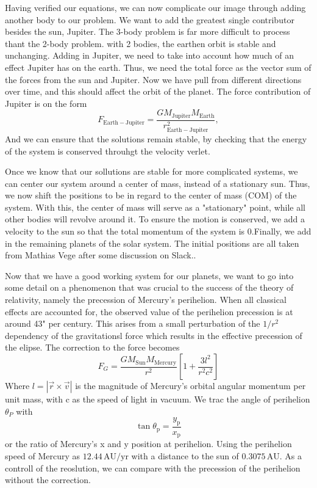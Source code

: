 \documentclass[10pt, twocolumn]{revtex4-1}
\begin{document}
Having verified our equations, we can now complicate our image through adding another body to our problem. We want to add the greatest single contributor
besides the sun, Jupiter. The 3-body problem is far more difficult to process thant the 2-body problem. with 2 bodies, the earthen orbit is stable and
unchanging. Adding in Jupiter, we need to take into account how much of an effect Jupiter has on the earth. Thus, we need the total force as the 
vector sum of the forces from the sun and Jupiter. Now we have pull from different directions over time, and this should affect the orbit of the planet.
The force contribution of Jupiter is on the form
\[
F_{\mathrm{Earth-Jupiter}}=\frac{GM_{\mathrm{Jupiter}}M_{\mathrm{Earth}}}{r_{\mathrm{Earth-Jupiter}}^2},
\]
And we can ensure that the solutions remain stable, by checking that the energy of the system is conserved throuhgt the velocity verlet. 

Once we know that our sollutions are stable for more complicated systems, we can center our system around a center of mass, instead of a stationary sun.
Thus, we now shift the positions to be in regard to the center of mass (COM) of the system. With this, the center of mass will serve as a "stationary" 
point, while all other bodies will revolve around it. To ensure the motion is conserved, we add a velocity to the sun so that the total momentum of the 
system is 0.Finally, we add in the remaining planets of the solar system. The initial positions are all taken from Mathias Vege after some discussion on
Slack.\cite{MathiasPlanetvalues}. 


Now that we have a good working system for our planets, we want to go into some detail on a phenomenon that was crucial to the success of the theory of
relativity, namely the precession of Mercury's perihelion. When all classical effects are accounted for, the observed value of the perihelion precession
is at around 43" per century. This arises from a small perturbation of the $1/r^2$ dependency of the gravitationsl force which results in the effective 
precession of the elipse. The correction to the force becomes 
\[
F_G = \frac{GM_\mathrm{Sun}M_\mathrm{Mercury}}{r^2}\left[1 + \frac{3l^2}{r^2c^2}\right]
\]
Where $l=|\vec{r}\times\vec{v}|$ is the magnitude of Mercury's orbital angular momentum per unit mass, with c as the speed of light in vacuum. We trac the
angle of perihelion $\theta_P$ with 
\[
\tan \theta_\mathrm{p} = \frac{y_\mathrm{p}}{x_\mathrm{p}}
\]
or the ratio of Mercury's x and y position at perihelion. Using the perihelion speed of Mercury as $12.44\,\mathrm{AU}/\mathrm{yr}$ with a distance to the 
sun of $0.3075\,\mathrm{AU}$. As a controll of the reoslution, we can compare with the precession of the perihelion without the correction. 
\end{document}

